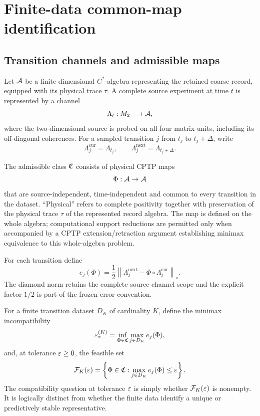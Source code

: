 \section{Finite-data common-map identification}
\label{sec:framework}

\subsection{Transition channels and admissible maps}

Let $\mathcal A$ be a finite-dimensional $C^*$-algebra representing the retained coarse record, equipped with its physical trace $\tau$.  A complete source experiment at time $t$ is represented by a channel
\begin{equation}
\Lambda_t:M_2\longrightarrow \mathcal A,
\end{equation}
where the two-dimensional source is probed on all four matrix units, including its off-diagonal coherences.  For a sampled transition $j$ from $t_j$ to $t_j+\Delta$, write
\begin{equation}
\Lambda_j^{\mathrm{cur}}=\Lambda_{t_j},\qquad
\Lambda_j^{\mathrm{next}}=\Lambda_{t_j+\Delta}.
\end{equation}

The admissible class $\mathfrak C$ consists of physical CPTP maps
\begin{equation}
\Phi:\mathcal A\to\mathcal A
\end{equation}
that are source-independent, time-independent and common to every transition in the dataset.  ``Physical'' refers to complete positivity together with preservation of the physical trace $\tau$ of the represented record algebra.  The map is defined on the whole algebra; computational support reductions are permitted only when accompanied by a CPTP extension/retraction argument establishing minimax equivalence to this whole-algebra problem.

For each transition define
\begin{equation}
e_j(\Phi)
=\frac12\left\|
\Lambda_j^{\mathrm{next}}
-\Phi\circ\Lambda_j^{\mathrm{cur}}
\right\|_\diamond .
\label{eq:error}
\end{equation}
The diamond norm retains the complete source-channel scope and the explicit factor $1/2$ is part of the frozen error convention.

For a finite transition dataset $D_K$ of cardinality $K$, define the minimax incompatibility
\begin{equation}
\varepsilon_*^{(K)}
=\inf_{\Phi\in\mathfrak C}\max_{j\in D_K}e_j(\Phi),
\label{eq:minimax}
\end{equation}
and, at tolerance $\varepsilon\ge0$, the feasible set
\begin{equation}
\mathcal F_K(\varepsilon)
=\left\{\Phi\in\mathfrak C:
\max_{j\in D_K}e_j(\Phi)\le\varepsilon
\right\}.
\label{eq:feasible-set}
\end{equation}
The compatibility question at tolerance $\varepsilon$ is simply whether $\mathcal F_K(\varepsilon)$ is nonempty.  It is logically distinct from whether the finite data identify a unique or predictively stable representative.

